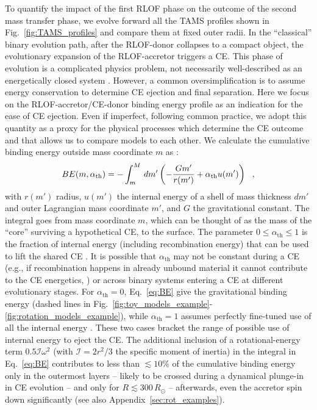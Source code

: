 \documentclass[twocolumn,twocolappendix,trackchanges]{aastex63}
\DeclareRobustCommand{\Eqref}[1]{Eq.~\ref{#1}}
\DeclareRobustCommand{\Figref}[1]{Fig.~\ref{#1}}
\begin{document}
To quantify the impact of the first RLOF phase on the outcome of the
second mass transfer phase, we evolve forward all the TAMS profiles
shown in \Figref{fig:TAMS_profiles} and compare them at fixed outer
radii. In the ``classical'' binary evolution path, after the
RLOF-donor collapses to a compact object, the evolutionary expansion
of the RLOF-accretor triggers a CE. This phase of evolution is a
complicated physics problem, not necessarily well-described as an
energetically closed system \citep[e.g.,][]{ivanova:2013,
  ivanova:2020, renzo:21gwce}.  However, a common oversimplification
is to assume energy conservation
\citep[``$\alpha_{\mathrm{CE}}\lambda_\mathrm{CE}$ algorithm'',
e.g.,][]{webbink:1984, dekool:1990, demarco:11} to determine CE
ejection and final separation. Here we focus on the
RLOF-accretor/CE-donor binding energy profile as an indication for the
ease of CE ejection. Even if imperfect, following
  common practice, we adopt this quantity as a
proxy for the physical processes which determine the CE outcome
and that allows us to compare models to each other. We
calculate the cumulative binding energy outside mass coordinate $m$ as
\citep[e.g.,][]{dekool:1990, dewi:2000, lau:2022}:
\begin{equation}
  \label{eq:BE}
BE(m, \alpha_{\rm th}) = - \int_{m}^M\,dm'\left( -\frac{G m'}{r(m')}+\alpha_\mathrm{th} u(m')\right) \ \ ,
\end{equation}
with $r(m')$ radius, $u(m')$ the internal energy of a shell of mass
thickness $dm'$ and outer Lagrangian mass coordinate $m'$, and $G$ the
gravitational constant. The integral goes from mass coordinate $m$,
which can be thought of as the mass of the ``core'' surviving a
hypothetical CE, to the surface. The parameter
$0\leq \alpha_\mathrm{th}\leq 1$ is the fraction of internal energy
(including recombination energy) that can be used to lift the shared
CE \citep[e.g.,][]{han:95}. It is possible that $\alpha_\mathrm{th}$
may not be constant during a CE (e.g., if recombination happens in
already unbound material it cannot contribute to the CE energetics,
\citealt{lau:22}) or across binary systems entering a CE at different
evolutionary stages. For $\alpha_\mathrm{th}=0$, \Eqref{eq:BE} give
the gravitational binding energy (dashed lines in
\Figref{fig:toy_models_example}-\ref{fig:rotation_models_example}),
while $\alpha_{\mathrm{th}}=1$ assumes perfectly fine-tuned use of all
the internal energy \citep[solid lines, see also][]{klencki:2020}. These two
cases bracket the range of possible use of internal energy to eject
the CE. The additional inclusion of a rotational-energy term
$0.5 \mathcal{I} \omega^2$ (with $\mathcal{I}=2r^2/3$ the specific
moment of inertia) in the integral in \Eqref{eq:BE} contributes to
less than $\lesssim 10\%$ of the cumulative binding energy only in the
outermost layers -- likely to be crossed during a dynamical plunge-in
in CE evolution -- and only for $R\lesssim 300\,R_\odot$ --
afterwards, even the accretor spin down significantly (see also
Appendix~\ref{sec:rot_examples}).
\end{document}
